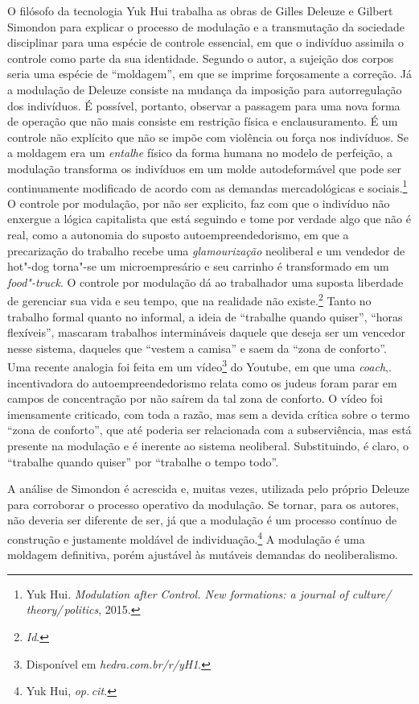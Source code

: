 O filósofo da tecnologia Yuk Hui trabalha as obras de Gilles
Deleuze e Gilbert Simondon para explicar o processo de modulação e a
transmutação da sociedade disciplinar para uma espécie de controle
essencial, em que o indivíduo assimila o controle como parte da sua
identidade. Segundo o autor, a sujeição dos corpos seria uma espécie de
``moldagem'', em que se imprime forçosamente a correção. Já a modulação
de Deleuze consiste na mudança da imposição para autorregulação dos
indivíduos. É possível, portanto, observar a passagem para uma nova
forma de operação que não mais consiste em restrição física e
enclausuramento. É um controle não explícito que não se impõe com
violência ou força nos indivíduos. Se a moldagem era um \textit{entalhe}
físico da forma humana no modelo de perfeição, a modulação transforma os
indivíduos em um molde autodeformável que pode ser continuamente
modificado de acordo com as demandas mercadológicas e sociais.\footnote{Yuk Hui. \textit{Modulation after Control. New formations: a journal of culture/\,theory/\,politics}, 2015.} O controle por modulação, por não ser explicito, faz com que o
indivíduo não enxergue a lógica capitalista que está seguindo e tome por
verdade algo que não é real, como a autonomia do suposto
autoempreendedorismo, em que a precarização do trabalho recebe uma
\textit{glamourização} neoliberal e um vendedor de hot"-dog torna"-se um
microempresário e seu carrinho é transformado em um \textit{food"-truck}. O
controle por modulação dá ao trabalhador uma suposta liberdade de
gerenciar sua vida e seu tempo, que na realidade não existe.\footnote{\textit{Id}.} Tanto no trabalho formal quanto no
informal, a ideia de ``trabalhe quando quiser'', ``horas
flexíveis'', mascaram trabalhos intermináveis daquele que deseja ser um
vencedor nesse sistema, daqueles que ``vestem a camisa'' e saem
da ``zona de conforto''. Uma recente analogia foi feita em um
vídeo\footnote{Disponível em \textit{hedra.com.br/r/yH1}.} do Youtube, em que uma \textit{coach},.
incentivadora do autoempreendedorismo relata como os judeus foram parar
em campos de concentração por não saírem da tal zona de conforto. O
vídeo foi imensamente criticado, com toda a razão, mas sem a devida
crítica sobre o termo ``zona de conforto'', que até poderia ser
relacionada com a subserviência, mas está presente na modulação e é
inerente ao sistema neoliberal. Substituindo, é claro, o ``trabalhe
quando quiser'' por ``trabalhe o tempo todo''.

A análise de Simondon é acrescida e, muitas vezes, utilizada pelo
próprio Deleuze para corroborar o processo operativo da modulação. Se
tornar, para os autores, não deveria ser diferente de ser, já que a
modulação é um processo contínuo de construção e justamente moldável de
individuação.\footnote{Yuk Hui, \textit{op.\,cit.}} A modulação é uma moldagem definitiva,
porém ajustável às mutáveis demandas do neoliberalismo.

